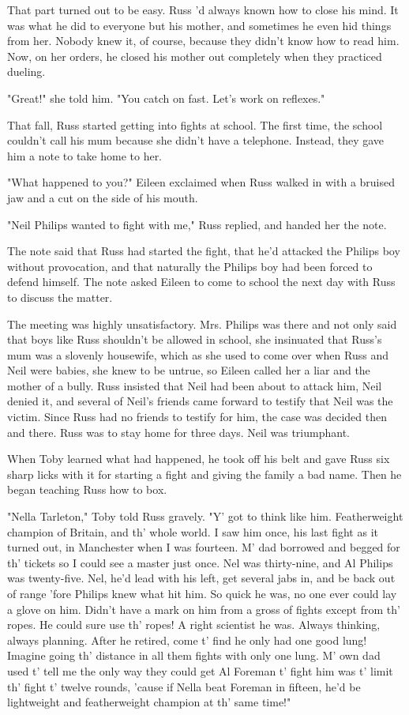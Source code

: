 \documentclass[a4paper,11pt]{article}
\begin{document}
That part turned out to be easy. Russ 'd always known how to close his mind. It was what he did to everyone but his mother, and sometimes he even hid things from her. Nobody knew it, of course, because they didn't know how to read him. Now, on her orders, he closed his mother out completely when they practiced dueling.

"Great!" she told him. "You catch on fast. Let's work on reflexes."

That fall, Russ started getting into fights at school. The first time, the school couldn't call his mum because she didn't have a telephone. Instead, they gave him a note to take home to her.

"What happened to you?" Eileen exclaimed when Russ walked in with a bruised jaw and a cut on the side of his mouth.

"Neil Philips wanted to fight with me," Russ replied, and handed her the note.

The note said that Russ had started the fight, that he'd attacked the Philips boy without provocation, and that naturally the Philips boy had been forced to defend himself. The note asked Eileen to come to school the next day with Russ to discuss the matter.

The meeting was highly unsatisfactory. Mrs. Philips was there and not only said that boys like Russ shouldn't be allowed in school, she insinuated that Russ's mum was a slovenly housewife, which as she used to come over when Russ and Neil were babies, she knew to be untrue, so Eileen called her a liar and the mother of a bully. Russ insisted that Neil had been about to attack him, Neil denied it, and several of Neil's friends came forward to testify that Neil was the victim. Since Russ had no friends to testify for him, the case was decided then and there. Russ was to stay home for three days. Neil was triumphant.

When Toby learned what had happened, he took off his belt and gave Russ six sharp licks with it for starting a fight and giving the family a bad name. Then he began teaching Russ how to box.

"Nella Tarleton," Toby told Russ gravely. "Y' got to think like him. Featherweight champion of Britain, and th' whole world. I saw him once, his last fight as it turned out, in Manchester when I was fourteen. M' dad borrowed and begged for th' tickets so I could see a master just once. Nel was thirty-nine, and Al Philips was twenty-five. Nel, he'd lead with his left, get several jabs in, and be back out of range 'fore Philips knew what hit him. So quick he was, no one ever could lay a glove on him. Didn't have a mark on him from a gross of fights except from th' ropes. He could sure use th' ropes! A right scientist he was. Always thinking, always planning. After he retired, come t' find he only had one good lung! Imagine going th' distance in all them fights with only one lung. M' own dad used t' tell me the only way they could get Al Foreman t' fight him was t' limit th' fight t' twelve rounds, 'cause if Nella beat Foreman in fifteen, he'd be lightweight and featherweight champion at th' same time!"
\end{document}
